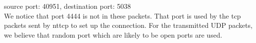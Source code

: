 source port: 40951, destination port: 5038 \\

We notice that port 4444 is not in these packets. That port is used by the tcp packets sent by nttcp to set up the connection.
For the transmitted UDP packets, we believe that random port which are likely to be open ports are used.
